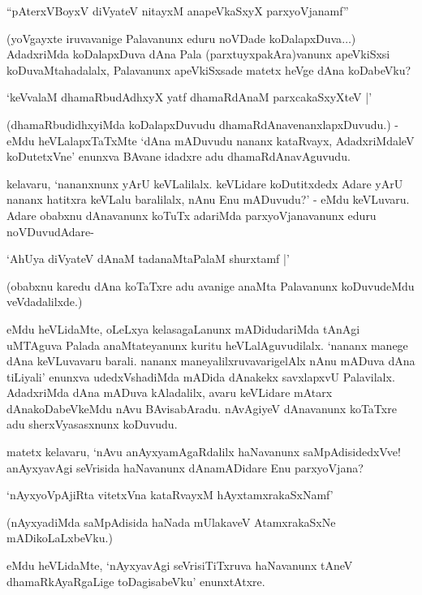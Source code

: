 \begin{shloka}
``pAterxVBoyxV diVyateV nitayxM anapeVkaSxyX parxyoVjanamf''
\end{shloka}

(yoVgayxte iruvavanige Palavanunx eduru noVDade koDalapxDuva$\ldots$) AdadxriMda koDalapxDuva dAna Pala (parxtuyxpakAra)vanunx apeVkiSxsi koDuvaMtahadalalx, Palavanunx apeVkiSxsade matetx heVge dAna koDabeVku?

\begin{shloka}
`keVvalaM dhamaRbudAdhxyX yatf dhamaRdAnaM parxcakaSxyXteV |'
\end{shloka}

(dhamaRbudidhxyiMda koDalapxDuvudu dhamaRdAnavenanxlapxDuvudu.) - eMdu heVLalapxTaTxMte `dAna mADuvudu nananx kataRvayx, AdadxriMdaleV koDutetxVne' enunxva BAvane idadxre adu dhamaRdAnavAguvudu.

kelavaru, `nananxnunx yArU keVLalilalx. keVLidare koDutitxdedx Adare yArU nananx hatitxra keVLalu baralilalx, nAnu Enu mADuvudu?' - eMdu keVLuvaru. Adare obabxnu dAnavanunx koTuTx adariMda parxyoVjanavanunx eduru noVDuvudAdare-

\begin{shloka}
`AhUya diVyateV dAnaM tadanaMtaPalaM shurxtamf |'
\end{shloka}

(obabxnu karedu dAna koTaTxre adu avanige anaMta Palavanunx koDuvudeMdu veVdadalilxde.)

eMdu heVLidaMte, oLeLxya kelasagaLanunx mADidudariMda tAnAgi uMTAguva Palada anaMtateyanunx kuritu heVLalAguvudilalx. `nananx manege dAna keVLuvavaru barali. nananx maneyalilxruvavarigelAlx nAnu mADuva dAna tiLiyali' enunxva udedxVshadiMda mADida dAnakekx savxlapxvU Palavilalx. AdadxriMda dAna mADuva kAladalilx, avaru keVLidare mAtarx dAnakoDabeVkeMdu nAvu BAvisabAradu. nAvAgiyeV dAnavanunx koTaTxre adu sherxVyasasxnunx koDuvudu.

matetx kelavaru, `nAvu anAyxyamAgaRdalilx haNavanunx saMpAdisidedxVve! anAyxyavAgi seVrisida haNavanunx dAnamADidare Enu parxyoVjana?

\begin{shloka}
`nAyxyoVpAjiRta vitetxVna kataRvayxM hAyxtamxrakaSxNamf'
\end{shloka}

(nAyxyadiMda saMpAdisida haNada mUlakaveV AtamxrakaSxNe mADikoLaLxbeVku.)

eMdu heVLidaMte, `nAyxyavAgi seVrisiTiTxruva haNavanunx tAneV dhamaRkAyaRgaLige toDagisabeVku' enunxtAtxre.

